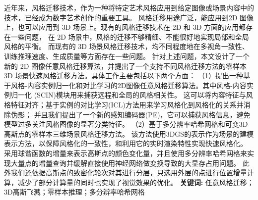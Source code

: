 \cleardoublepage
{}

\setlength{\parindent}{2em} 
近年来，风格迁移技术，作为一种将特定艺术风格应用到给定图像或场景内容中的技术，已经成为数字艺术创作的重要工具。
风格迁移用途广泛，能应用到2D 图像上，也可以应用到 3D 场景上。现有的风格迁移技术在 2D 和 3D 方面的应用都存在一些问题，
在 2D 场景中，风格的迁移不够精细、不能很好地实现局部和全局风格的平衡。
而现有的 3D 场景风格迁移技术，均不同程度地在多视角一致性、训练推理速度、生成质量等方面存在一些问题。
针对上述问题，本文设计了一个新的 2D 图像任意风格迁移算法，并提出了一个支持不同风格迁移方法的零样本 3D 场景快速风格迁移方法。具体工作主要包括以下两个方面：
\newline \indent（1）提出一种基于风格-内容实例归一化和对比学习的2D图像任意风格迁移算法。其中风格-内容实例归一化 (SCIN)模块用来捕获远程和全局的风格相关性。
这可以将内容特征与风格特征对齐；基于实例的对比学习(ICL)方法用来学习风格化到风格化的关系并消除伪影；
并且我们提出了一个新的感知编码器(PE)，它可以捕获风格信息，避免模型过多关注风格图像的显著分类特征。   
\newline \indent（2）基于多分辨率哈希网格和可变3D高斯点的零样本三维场景风格迁移方法。
该方法使用3DGS的表示作为场景的建模表示方法，以保障风格化的一致性，和利用它的实时渲染特性实现快速风格化。
采用球谐函数的增量来表示高斯点的颜色变化量，并且使用多分辨率哈希网格来实现大量点的增量查询并缓解直接使用神经网络做变换导致的大显存占用问题。
此外我们还依据高斯点的致密化轮次对其进行分层，只选用外层的点进行位置增量计算，减少了部分计算量的同时也实现了视觉效果的优化。
\newline
{\textbf{关键词:}}
任意风格迁移；3D高斯飞溅；零样本推理；多分辨率哈希网格


